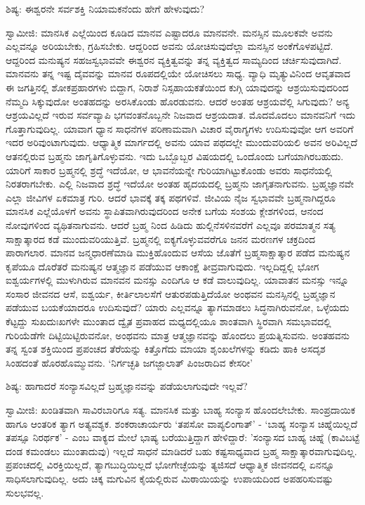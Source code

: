 ಶಿಷ್ಯ: ಈಶ್ವರನೇ ಸರ್ವಶಕ್ತಿ ನಿಯಾಮಕನೆಂದು ಹೇಗೆ ಹೇಳುವುದು?

ಸ್ವಾಮೀಜಿ: ಮಾನಸಿಕ ಎಲ್ಲೆಯಿಂದ ಕೂಡಿದ ಮಾನವ ಎಷ್ಟಾದರೂ ಮಾನವನೇ. ಮನಸ್ಸಿನ ಮೂಲಕವೇ ಅವನು ಎಲ್ಲವನ್ನೂ ಅರಿಯಬೇಕು, ಗ್ರಹಿಸಬೇಕು. ಆದ್ದರಿಂದ ಅವನು ಯೋಚಿಸುವುದೆಲ್ಲಾ ಮನಸ್ಸಿನ ಅಂಕೆಗೊಳಪಟ್ಟಿದೆ. ಆದ್ದರಿಂದ ಮನುಷ್ಯನ ಸಹಜಸ್ವಭಾವವೇ ಈಶ್ವರನ ವ್ಯಕ್ತಿತ್ವವನ್ನು ತನ್ನ ವ್ಯಕ್ತಿತ್ವದ ಸಾಮ್ಯದಿಂದ ಚರ್ಚಿಸುವುದಾಗಿದೆ. ಮಾನವನು ತನ್ನ ಇಷ್ಟ ದೈವವನ್ನು ಮಾನವ ರೂಪದಲ್ಲಿಯೇ ಯೋಚಿಸಲು ಸಾಧ್ಯ. ವ್ಯಾಧಿ ಮೃತ್ಯುವಿನಿಂದ ಆವೃತವಾದ ಈ ಜಗತ್ತಿನಲ್ಲಿ ಶೋಕಪ್ರಹಾರಗಳು ಬಿದ್ದಾಗ, ನಿರಾಶೆ ನಿಸ್ಸಹಾಯಕತೆಯಿಂದ ಕುಗ್ಗಿ ಯಾವುದನ್ನು ಆಶ್ರಯಿಸುವುದರಿಂದ ನೆಮ್ಮದಿ ಸಿಕ್ಕುವುದೋ ಅಂತಹದನ್ನು ಅರಸಿಕೊಂಡು ಹೊರಡುವನು. ಆದರೆ ಅಂತಹ ಆಶ್ರಯವೆಲ್ಲಿ ಸಿಗುವುದು? ಅನ್ಯ ಆಶ್ರಯವಿಲ್ಲದೆ ಇರುವ ಸರ್ವವ್ಯಾಪಿ ಭಗವಂತನೊಬ್ಬನೇ ನಿಜವಾದ ಆಶ್ರಯದಾತ. ಮೊದಮೊದಲು ಮಾನವನಿಗೆ ಇದು ಗೊತ್ತಾಗುವುದಿಲ್ಲ. ಯಾವಾಗ ಧ್ಯಾನ ಸಾಧನೆಗಳ ಪರಿಣಾಮವಾಗಿ ವಿಚಾರ ವೈರಾಗ್ಯಗಳು ಉದಿಸುವುವೋ ಆಗ ಅವರಿಗೆ ಇದರ ಅರಿವುಂಟಾಗುವುದು. ಆಧ್ಯಾತ್ಮಿಕ ಮಾರ್ಗದಲ್ಲಿ ಅವನು ಯಾವ ಪಥದಲ್ಲೇ ಮುಂದುವರಿಯಲಿ ಅವನ ಅರಿವಿಲ್ಲದೆ ಆತನಲ್ಲಿರುವ ಬ್ರಹ್ಮನು ಜಾಗೃತಿಗೊಳ್ಳುವನು. ಇದು ಒಬ್ಬೊಬ್ಬರ ವಿಷಯದಲ್ಲಿ ಒಂದೊಂದು ಬಗೆಯಾಗಿರಬಹುದು. ಯಾರಿಗೆ ಸಾಕಾರ ಬ್ರಹ್ಮನಲ್ಲಿ ಶ್ರದ್ಧೆ ಇದೆಯೋ, ಆ ಭಾವನೆಯನ್ನೇ ಗುರಿಯಾಗಿಟ್ಟುಕೊಂಡು ಅವರು ಸಾಧನೆಯಲ್ಲಿ ನಿರತರಾಗಬೇಕು. ಎಲ್ಲಿ ನಿಜವಾದ ಶ್ರದ್ಧೆ ಇದೆಯೋ ಅಂತಹ ಹೃದಯದಲ್ಲಿ ಬ್ರಹ್ಮನು ಜಾಗೃತನಾಗುವನು. ಬ್ರಹ್ಮಜ್ಞಾನವೇ ಎಲ್ಲಾ ಜೀವಿಗಳ ಏಕಮಾತ್ರ ಗುರಿ. ಆದರೆ ಭಾವಕ್ಕೆ ತಕ್ಕ ಪಥಗಳಿವೆ. ಜೀವಿಯ ನೈಜ ಸ್ವಭಾವವೇ ಬ್ರಹ್ಮನಾಗಿದ್ದರೂ ಮಾನಸಿಕ ಎಲ್ಲೆಯೊಳಗೆ ಅವನು ಸ್ಥಾಪಿತವಾಗಿರುವುದರಿಂದ ಅನೇಕ ಬಗೆಯ ಸಂಶಯ ಕ್ಲೇಶಗಳಿಂದ, ಆನಂದ ನೋವುಗಳಿಂದ ವ್ಯಥಿತನಾಗುವನು. ಆದರೆ ಬ್ರಹ್ಮ ನಿಂದ ಹಿಡಿದು ಹುಲ್ಲಿನೆಸಳಿನವರೆಗೆ ಎಲ್ಲವೂ ಪರಮಾತ್ಮನ ಸತ್ಯ ಸಾಕ್ಷಾತ್ಕಾರದ ಕಡೆ ಮುಂದುವರಿಯುತ್ತಿವೆ. ಬ್ರಹ್ಮನಲ್ಲಿ ಐಕ್ಯಗೊಳ್ಳುವವರೆಗೂ ಜನನ ಮರಣಗಳ ಚಕ್ರದಿಂದ ಪಾರಾಗಲಾರ. ಮಾನವ ಜನ್ಮಧಾರಣೆಮಾಡಿ ಮುಕ್ತಿಹೊಂದುವ ಆಸೆಯ ಜೊತೆಗೆ ಬ್ರಹ್ಮಸಾಕ್ಷಾತ್ಕಾರ ಪಡೆದ ಮನುಷ್ಯನ ಕೃಪೆಯೂ ದೊರೆತರೆ ಮನುಷ್ಯನ ಆತ್ಮಜ್ಞಾನ ಪಡೆಯುವ ಆಕಾಂಕ್ಷೆ ತೀವ್ರವಾಗುವುದು. ಇಲ್ಲದಿದ್ದಲ್ಲಿ ಭೋಗ ಐಶ್ವರ್ಯಗಳಲ್ಲಿ ಮುಳುಗಿರುವ ಮಾನವನ ಮನಸ್ಸು ಎಂದಿಗೂ ಆ ಕಡೆ ವಾಲುವುದಿಲ್ಲ. ಯಾವಾತನ ಮನಸ್ಸು ಇನ್ನೂ ಸಂಸಾರ ಜೀವನದ ಆಸೆ, ಐಶ್ವರ್ಯ, ಕೀರ್ತಿಲಾಲಸೆಗೆ ಆತುರಪಡುತ್ತಿದೆಯೋ ಅಂಥವನ ಮನಸ್ಸಿನಲ್ಲಿ ಬ್ರಹ್ಮಜ್ಞಾನ ಪಡೆಯುವ ಬಯಕೆಯಾದರೂ ಉದಿಸುವುದೆ? ಯಾರು ಎಲ್ಲವನ್ನೂ ತ್ಯಾಗಮಾಡಲು ಸಿದ್ಧನಾಗಿರುವನೋ, ಒಳ್ಳೆಯದು ಕೆಟ್ಟದ್ದು ಸುಖದುಃಖಗಳೇ ಮುಂತಾದ ದ್ವೈತ ಪ್ರವಾಹದ ಮಧ್ಯದಲ್ಲಿಯೂ ಶಾಂತವಾಗಿ ಸ್ಥಿರವಾಗಿ ಸಮಭಾವದಲ್ಲಿ ಗುರಿಯೆಡೆಗೇ ದಿಟ್ಟಿಯಿಟ್ಟಿರುವನೋ, ಅಂಥವನು ಮಾತ್ರ ಆತ್ಮಜ್ಞಾನವನ್ನು ಹೊಂದಲು ಪ್ರಯತ್ನಿಸುವನು. ಅಂತಹವನು ತನ್ನ ಸ್ವಂತ ಶಕ್ತಿಯಿಂದ ಪ್ರಪಂಚದ ತೆರೆಯನ್ನು ಕಿತ್ತೊಗೆದು ಮಾಯಾ ಶೃಂಖಲೆಗಳನ್ನು ಕಡಿದು ಹಾಕಿ ಅಸದೃಶ ಸಿಂಹದಂತೆ ಹೊರಹೊಮ್ಮುವನು. ‘ನಿರ್ಗಚ್ಛತಿ ಜಗಜ್ಜಾಲಾತ್ ಪಿಂಜರಾದಿವ ಕೇಸರೀ’

ಶಿಷ್ಯ: ಹಾಗಾದರೆ ಸಂನ್ಯಾಸವಿಲ್ಲದೆ ಬ್ರಹ್ಮಜ್ಞಾನವನ್ನು ಪಡೆಯಲಾಗುವುದೇ ಇಲ್ಲವೆ?

ಸ್ವಾಮೀಜಿ: ಖಂಡಿತವಾಗಿ ಸಾವಿರಬಾರಿಗೂ ಸತ್ಯ. ಮಾನಸಿಕ ಮತ್ತು ಬಾಹ್ಯ ಸಂನ್ಯಾಸ ಹೊಂದಲೇಬೇಕು. ಸಾಂಪ್ರದಾಯಿಕ ಹಾಗೂ ಆಂತರಿಕ ತ್ಯಾಗ ಅತ್ಯವಶ್ಯಕ. ಶಂಕರಾಚಾರ್ಯರು ‘ತಪಸೋ ವಾಪ್ಯಲಿಂಗಾತ್’ - ‘ಬಾಹ್ಯ ಸಂನ್ಯಾಸ ಚಿಹ್ನೆಯಿಲ್ಲದೆ ತಪಸ್ಸೂ ನಿರರ್ಥಕ’ - ಎಂಬ ವಾಕ್ಯದ ಮೇಲೆ ಭಾಷ್ಯ ಬರೆಯುತ್ತಿದ್ದಾಗ ಹೇಳಿದ್ದಾರೆ: 'ಸಂನ್ಯಾಸದ ಬಾಹ್ಯ ಚಿಹ್ನೆ (ಕಾವಿಬಟ್ಟೆ ದಂಡ ಕಮಂಡಲು ಮುಂತಾದುವು) ಇಲ್ಲದೆ ಸಾಧನೆ ಮಾಡಿದರೆ ಬಹು ಕಷ್ಟಸಾಧ್ಯವಾದ ಬ್ರಹ್ಮ ಸಾಕ್ಷಾತ್ಕಾರವಾಗುವುದಿಲ್ಲ. ಪ್ರಪಂಚದಲ್ಲಿ ವಿರಕ್ತಿಯಿಲ್ಲದೆ, ತ್ಯಾಗಬುದ್ಧಿಯಿಲ್ಲದೆ ಭೋಗೇಚ್ಛೆಯನ್ನು ತ್ಯಜಿಸದೆ ಆಧ್ಯಾತ್ಮಿಕ ಜೀವನದಲ್ಲಿ ಏನನ್ನೂ ಸಾಧಿಸಲಾಗುವುದಿಲ್ಲ. ಅದು ಚಿಕ್ಕ ಮಗುವಿನ ಕೈಯಲ್ಲಿರುವ ಮಿಠಾಯಿಯನ್ನು ಉಪಾಯದಿಂದ ಅಪಹರಿಸುವಷ್ಟು ಸುಲಭವಲ್ಲ.

